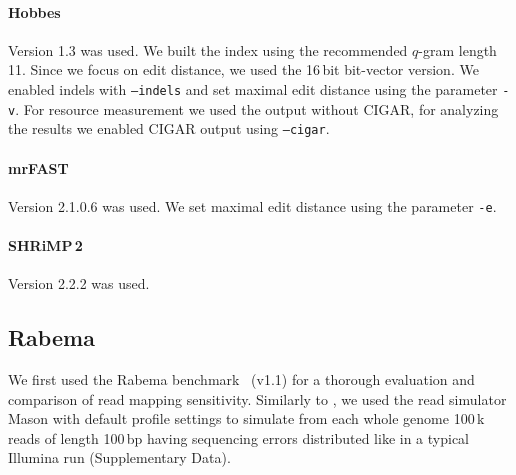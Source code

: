 \paragraph{Hobbes}
Version 1.3 was used.
We built the index using the recommended
$q$-gram length 11.
Since we focus on edit distance, we used the 16\,bit bit-vector version.%
We enabled indels with \texttt{--indels} and set maximal edit distance using the parameter \texttt{-v}.
For resource measurement we used the output without CIGAR, for analyzing the results we enabled CIGAR output using \texttt{--cigar}.

\paragraph{mrFAST}
Version 2.1.0.6 was used.
We set maximal edit distance using the parameter \texttt{-e}.

\paragraph{SHRiMP\,2}
Version 2.2.2 was used.

\subsection{Rabema}

We first used the Rabema benchmark~\citep{Holtgrewe2011} (v1.1) for a thorough evaluation and comparison of read mapping sensitivity.
Similarly to \citep{Bowtie2}, we used the read simulator Mason \citep{SeqAnReadSimulator} with default profile settings to simulate from each whole genome 100\,k reads of length 100\,bp having sequencing errors distributed like in a typical Illumina run (Supplementary Data).

